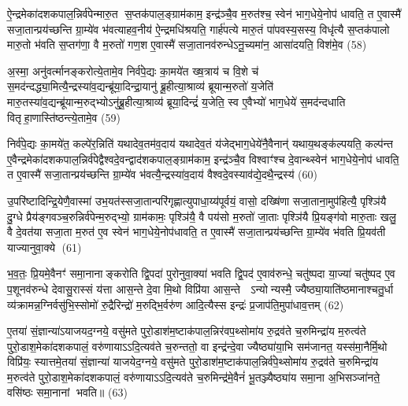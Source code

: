 {\anuvakamend[{रु॒द्रो भे॑ष॒जं वि॒न्दते॒ यदि॑ स्तृणी॒याद॒र्द्धन्द्वाद॑श च।10।}]}

ऐ॒न्द्रमेका॑दशकपाल॒न्निर्व॑पेन्मारु॒त स॒प्तक॑पाल॒ङ्ग्राम॑काम॒ इन्द्र॑ञ्चै॒व म॒रुत॑श्च॒ स्वेन॑ भाग॒धेये॒नोप॑ धावति॒ त ए॒वास्मै॑ सजा॒तान्प्रय॑च्छन्ति ग्रा॒म्ये॑व भ॑वत्याहव॒नीय॑ ऐ॒न्द्रमधि॑श्रयति॒ गार्\mbox{}ह॑पत्ये मारु॒तं पा॑पवस्य॒सस्य॒ विधृ॑त्यै स॒प्तक॑पालो मारु॒तो भ॑वति स॒प्तग॑णा॒ वै म॒रुतो॑ गण॒श ए॒वास्मै॑ सजा॒तानव॑रुन्धेऽनू॒च्यमा॑न॒ आसा॑दयति॒ विश॑मे॒व (58)

अ॒स्मा॒ अनु॑वर्त्मानङ्करोत्ये॒तामे॒व निर्व॑पे॒द्यः का॒मये॑त ख्ष॒त्राय॑ च वि॒शे च॑ स॒मद॑न्दद्ध्या॒मित्यै॒न्द्रस्या॑व॒द्यन्ब्रू॑या॒दिन्द्रा॒यानु॑ ब्रू॒हीत्या॒श्राव्य॑ ब्रूयान्म॒रुतो॑ य॒जेति॑ मारु॒तस्या॑व॒द्यन्ब्रू॑यान्म॒रुद्भ्योऽनु॑ब्रू॒हीत्या॒श्राव्य॑ ब्रूया॒दिन्द्रं॑ य॒जेति॒ स्व ए॒वैभ्यो॑ भाग॒धेये॑ स॒मद॑न्दधाति वितृहा॒णास्ति॑ष्ठन्त्ये॒तामे॒व (59)

निर्व॑पे॒द्यः का॒मये॑त॒ कल्पे॑र॒न्निति॑ यथादेव॒तम॑व॒दाय॑ यथादेव॒तं य॑जेद्भाग॒धेये॑नै॒वैनान्॑ यथाय॒थङ्क॑ल्पयति॒ कल्प॑न्त ए॒वैन्द्रमेका॑दशकपाल॒न्निर्व॑पेद्वैश्वदे॒वन्द्वाद॑शकपाल॒ङ्ग्राम॑काम॒ इन्द्र॑ञ्चै॒व विश्वाꣳ॑श्च दे॒वान्थ्स्वेन॑ भाग॒धेये॒नोप॑ धावति॒ त ए॒वास्मै॑ सजा॒तान्प्रय॑च्छन्ति ग्रा॒म्ये॑व भ॑वत्यै॒न्द्रस्या॑व॒दाय॑ वैश्वदे॒वस्याव॑द्ये॒दथै॒न्द्रस्य॑ (60)

उ॒परि॑ष्टादिन्द्रि॒येणै॒वास्मा॑ उभ॒यत॑स्सजा॒तान्परि॑गृह्णात्युपाधा॒य्य॑पूर्वयं॒ वासो॒ दख्षि॑णा सजा॒ताना॒मुप॑हित्यै॒ पृश्ञि॑यै दु॒ग्धे प्रैय॑ङ्गवञ्च॒रुन्निर्व॑पेन्म॒रुद्भ्यो॒ ग्राम॑कामः॒ पृश्ञि॑यै॒ वै पय॑सो म॒रुतो॑ जा॒ताः पृश्ञि॑यै प्रि॒यङ्ग॑वो मारु॒ताः खलु॒ वै दे॒वत॑या सजा॒ता म॒रुत॑ ए॒व स्वेन॑ भाग॒धेये॒नोप॑धावति॒ त ए॒वास्मै॑ सजा॒तान्प्रय॑च्छन्ति ग्रा॒म्ये॑व भ॑वति प्रि॒यव॑ती याज्यानुवा॒क्ये (61)

भ॒व॒तः॒ प्रि॒यमे॒वैनꣳ॑ समा॒नानाङ्करोति द्वि॒पदा॑ पुरोनुवा॒क्या॑ भवति द्वि॒पद॑ ए॒वाव॑रुन्धे॒ चतु॑ष्पदा या॒ज्या॑ चतु॑ष्पद ए॒व प॒शूनव॑रुन्धे देवासु॒रास्सं य॑त्ता आस॒न्ते दे॒वा मि॒थो विप्रि॑या आस॒न्ते  ऽन्योन्यस्मै॒ ज्यैष्ठ्या॒याति॑ष्ठमानाश्चतु॒र्धा व्य॑क्रामन्न॒ग्निर्वसु॑भि॒स्सोमो॑ रु॒द्रैरिन्द्रो॑ म॒रुद्भि॒र्वरु॑ण आदि॒त्यैस्स इन्द्रः॑ प्र॒जाप॑ति॒मुपा॑धाव॒त्तम् (62)

ए॒तया॑ सं॒ज्ञान्या॑ऽयाजयद॒ग्नये॒ वसु॑मते पुरो॒डाश॑म॒ष्टाक॑पाल॒न्निर॑वप॒थ्सोमा॑य रु॒द्रव॑ते च॒रुमिन्द्रा॑य म॒रुत्व॑ते पुरो॒डाश॒मेका॑दशकपालं॒ वरु॑णायाऽऽदि॒त्यव॑ते च॒रुन्ततो॒ वा इन्द्र॑न्दे॒वा ज्यैष्ठ्या॑या॒भि सम॑जानत॒ यस्स॑मा॒नैर्मि॒थो विप्रि॑यः॒ स्यात्तमे॒तया॑ सं॒ज्ञान्या॑ याजयेद॒ग्नये॒ वसु॑मते पुरो॒डाश॑म॒ष्टाक॑पाल॒न्निर्व॑पे॒थ्सोमा॑य रु॒द्रव॑ते च॒रुमिन्द्रा॑य म॒रुत्व॑ते पुरो॒डाश॒मेका॑दशकपालं॒ वरु॑णायाऽऽदि॒त्यव॑ते च॒रुमिन्द्र॑मे॒वैनं॑ भू॒तञ्ज्यैष्ठ्या॑य समा॒ना अ॒भिसञ्जा॑नते॒ वसि॑ष्ठः समा॒नानां भवति॥ (63)

